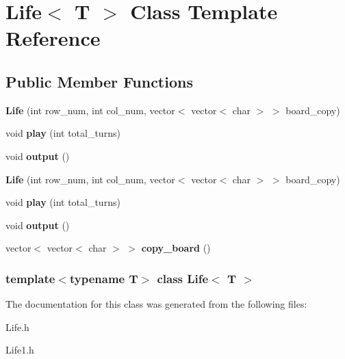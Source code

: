 \hypertarget{classLife}{\section{\-Life$<$ \-T $>$ \-Class \-Template \-Reference}
\label{classLife}
}
\subsection*{\-Public \-Member \-Functions}
\begin{DoxyCompactItemize}
\item 
\hypertarget{classLife_a5d926e9004109059ec5e749fce219de7}{{\bfseries \-Life} (int row\-\_\-num, int col\-\_\-num, vector$<$ vector$<$ char $>$ $>$ board\-\_\-copy)}\label{classLife_a5d926e9004109059ec5e749fce219de7}

\item 
\hypertarget{classLife_a768f6a058a734d5a9b15ec4a8d457625}{void {\bfseries play} (int total\-\_\-turns)}\label{classLife_a768f6a058a734d5a9b15ec4a8d457625}

\item 
\hypertarget{classLife_a996113123899be5b190eac2aa2758e85}{void {\bfseries output} ()}\label{classLife_a996113123899be5b190eac2aa2758e85}

\item 
\hypertarget{classLife_a5d926e9004109059ec5e749fce219de7}{{\bfseries \-Life} (int row\-\_\-num, int col\-\_\-num, vector$<$ vector$<$ char $>$ $>$ board\-\_\-copy)}\label{classLife_a5d926e9004109059ec5e749fce219de7}

\item 
\hypertarget{classLife_a768f6a058a734d5a9b15ec4a8d457625}{void {\bfseries play} (int total\-\_\-turns)}\label{classLife_a768f6a058a734d5a9b15ec4a8d457625}

\item 
\hypertarget{classLife_a996113123899be5b190eac2aa2758e85}{void {\bfseries output} ()}\label{classLife_a996113123899be5b190eac2aa2758e85}

\item 
\hypertarget{classLife_a10569cd81d9f07a6b9d6cc0af161dfc0}{vector$<$ vector$<$ char $>$ $>$ {\bfseries copy\-\_\-board} ()}\label{classLife_a10569cd81d9f07a6b9d6cc0af161dfc0}

\end{DoxyCompactItemize}
\subsubsection*{template$<$typename T$>$ class Life$<$ T $>$}



\-The documentation for this class was generated from the following files\-:\begin{DoxyCompactItemize}
\item 
\-Life.\-h\item 
\-Life1.\-h\end{DoxyCompactItemize}

